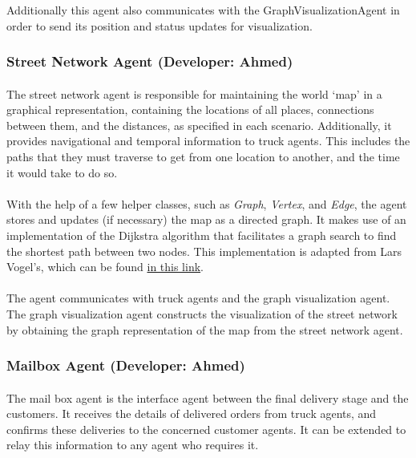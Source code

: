 \documentclass[11pt, a4paper]{article}
\begin{document}
Additionally this agent also communicates with the GraphVisualizationAgent in order to send its position and status updates for visualization. 
\subsubsection{Street Network Agent (Developer: Ahmed)}
\paragraph{}
The street network agent is responsible for maintaining the world `map' in a graphical representation, containing the locations of all places, connections between them, and the distances, as specified in each scenario. Additionally, it provides navigational and temporal information to truck agents. This includes the paths that they must traverse to get from one location to another, and the time it would take to do so.
\paragraph{}
With the help of a few helper classes, such as \textit{Graph}, \textit{Vertex}, and \textit{Edge}, the agent stores and updates (if necessary) the map as a directed graph. It makes use of an implementation of the Dijkstra algorithm that facilitates a graph search to find the shortest path between two nodes. This implementation is adapted from Lars Vogel's, which can be found \href{http://www.vogella.com/tutorials/JavaAlgorithmsDijkstra/article.html}{in this link}.
\paragraph{}
The agent communicates with truck agents and the graph visualization agent. The graph visualization agent constructs the visualization of the street network by obtaining the graph representation of the map from the street network agent.
\subsubsection{Mailbox Agent (Developer: Ahmed)}
\paragraph{}
The mail box agent is the interface agent between the final delivery stage and the customers. It receives the details of delivered orders from truck agents, and confirms these deliveries to the concerned customer agents. It can be extended to relay this information to any agent who requires it.
\end{document}
